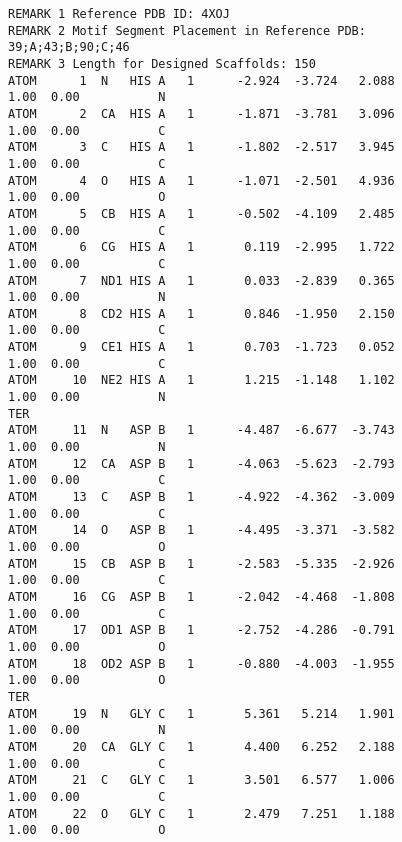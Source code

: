 
\begin{figure}
    \centering
\begin{tcolorbox}[
  title={},
  fonttitle=\bfseries,       %
  colback=white,             %
  colframe=black,            %
  coltitle=white,            %
  sharp corners,             %
  boxrule=0.5mm,             %
  toptitle=0.2mm,              %
  bottomtitle=1mm,           %
  titlerule=1mm              %
]

\small %
\begin{verbatim}
REMARK 1 Reference PDB ID: 4XOJ
REMARK 2 Motif Segment Placement in Reference PDB: 39;A;43;B;90;C;46
REMARK 3 Length for Designed Scaffolds: 150
ATOM      1  N   HIS A   1      -2.924  -3.724   2.088  1.00  0.00           N  
ATOM      2  CA  HIS A   1      -1.871  -3.781   3.096  1.00  0.00           C  
ATOM      3  C   HIS A   1      -1.802  -2.517   3.945  1.00  0.00           C  
ATOM      4  O   HIS A   1      -1.071  -2.501   4.936  1.00  0.00           O  
ATOM      5  CB  HIS A   1      -0.502  -4.109   2.485  1.00  0.00           C  
ATOM      6  CG  HIS A   1       0.119  -2.995   1.722  1.00  0.00           C  
ATOM      7  ND1 HIS A   1       0.033  -2.839   0.365  1.00  0.00           N  
ATOM      8  CD2 HIS A   1       0.846  -1.950   2.150  1.00  0.00           C  
ATOM      9  CE1 HIS A   1       0.703  -1.723   0.052  1.00  0.00           C  
ATOM     10  NE2 HIS A   1       1.215  -1.148   1.102  1.00  0.00           N  
TER
ATOM     11  N   ASP B   1      -4.487  -6.677  -3.743  1.00  0.00           N  
ATOM     12  CA  ASP B   1      -4.063  -5.623  -2.793  1.00  0.00           C  
ATOM     13  C   ASP B   1      -4.922  -4.362  -3.009  1.00  0.00           C  
ATOM     14  O   ASP B   1      -4.495  -3.371  -3.582  1.00  0.00           O  
ATOM     15  CB  ASP B   1      -2.583  -5.335  -2.926  1.00  0.00           C  
ATOM     16  CG  ASP B   1      -2.042  -4.468  -1.808  1.00  0.00           C  
ATOM     17  OD1 ASP B   1      -2.752  -4.286  -0.791  1.00  0.00           O  
ATOM     18  OD2 ASP B   1      -0.880  -4.003  -1.955  1.00  0.00           O  
TER
ATOM     19  N   GLY C   1       5.361   5.214   1.901  1.00  0.00           N  
ATOM     20  CA  GLY C   1       4.400   6.252   2.188  1.00  0.00           C  
ATOM     21  C   GLY C   1       3.501   6.577   1.006  1.00  0.00           C  
ATOM     22  O   GLY C   1       2.479   7.251   1.188  1.00  0.00           O  

\end{verbatim}
\end{tcolorbox}
\end{figure}
